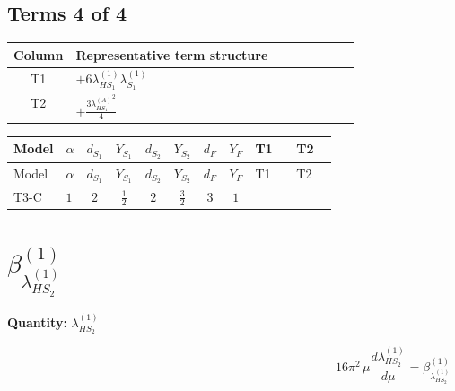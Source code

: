 \documentclass[8pt]{article}
\begin{document}
\begin{landscape}
\subsection*{Terms 4 of 4}
\begin{center}
\begin{tabular}{@{}c >{\raggedright\arraybackslash}p{0.82\linewidth}@{}}
\toprule
Column & Representative term structure \\
\midrule
T1 & \(\displaystyle +6 {\lambda_{HS_1}^{(1)}} {\lambda_{S_1}^{(1)}}\) \\
\midrule
T2 & \(\displaystyle +\frac{3 {\lambda_{HS_1}^{(A)}}^2}{4}\) \\
\midrule
\bottomrule
\end{tabular}
\end{center}
\smallskip
\tiny
\begin{longtable}{@{}llcccccc >{\raggedright\arraybackslash}p{0.21\linewidth} >{\raggedright\arraybackslash}p{0.21\linewidth}@{}}
\toprule
Model & $\alpha$ & $d_{S_1}$ & $Y_{S_1}$ & $d_{S_2}$ & $Y_{S_2}$ & $d_F$ & $Y_F$ & T1 & T2 \\
\midrule
\endfirsthead
\toprule
Model & $\alpha$ & $d_{S_1}$ & $Y_{S_1}$ & $d_{S_2}$ & $Y_{S_2}$ & $d_F$ & $Y_F$ & T1 & T2 \\
\midrule
\endhead
T3-C & $1$ & $2$ & $\frac{1}{2}$ & $2$ & $\frac{3}{2}$ & $3$ & $1$ & \scriptsize\adjustbox{max width=\linewidth}{$\begin{gathered} +6 {\lambda_{HS_1}^{(1)}} {\lambda_{S_1}^{(1)}}\end{gathered}$} & \scriptsize\adjustbox{max width=\linewidth}{$\begin{gathered} +\frac{3 {\lambda_{HS_1}^{(A)}}^2}{4}\end{gathered}$} \\
\midrule
\bottomrule
\end{longtable}
\clearpage
\section*{$\beta_{\lambda_{HS_2}^{(1)}}^{(1)}$}
\noindent\textbf{Quantity: }$\lambda_{HS_2}^{(1)}$\par\smallskip
\[16\pi^2\,\mu\frac{d \lambda_{HS_2}^{(1)}}{d\mu}=\beta_{\lambda_{HS_2}^{(1)}}^{(1)}\]

\end{landscape}
\end{document}
